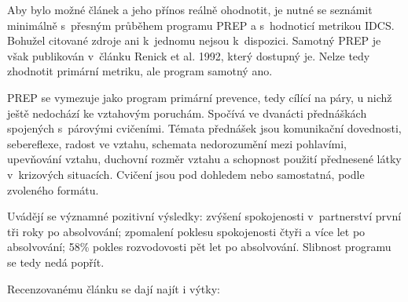 Aby bylo možné článek a jeho přínos reálně ohodnotit, je nutné se seznámit
minimálně s~přesným průběhem programu PREP a s~hodnoticí metrikou IDCS. Bohužel
citované zdroje ani k~jednomu nejsou k~dispozici. Samotný PREP je však
publikován v~článku Renick et al. 1992\cite{renick1992prevention}, který
dostupný je. Nelze tedy zhodnotit primární metriku, ale program samotný ano.

PREP se vymezuje jako program primární prevence, tedy cílící na páry, u nichž
ještě nedochází ke vztahovým poruchám. Spočívá ve dvanácti přednáškách spojených
s~párovými cvičeními. Témata přednášek jsou komunikační dovednosti, sebereflexe,
radost ve vztahu, schemata nedorozumění mezi pohlavími, upevňování vztahu,
duchovní rozměr vztahu a schopnost použití přednesené látky v~krizových
situacích. Cvičení jsou pod dohledem nebo samostatná, podle zvoleného formátu.

Uvádějí se významné pozitivní výsledky: zvýšení spokojenosti v~partnerství první
tři roky po absolvování; zpomalení poklesu spokojenosti čtyři a více let po
absolvování; 58\% pokles rozvodovosti pět let po absolvování. Slibnost programu
se tedy nedá popřít.

Recenzovanému článku se dají najít i výtky:

